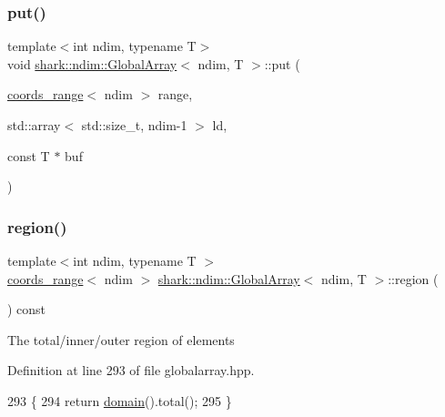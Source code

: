 \subsubsection{\texorpdfstring{put()}{put()}\hspace{0.1cm}{\footnotesize\ttfamily [3/3]}}
{\footnotesize\ttfamily template$<$int ndim, typename T$>$ \\
void \hyperlink{classshark_1_1ndim_1_1_global_array}{shark\+::ndim\+::\+Global\+Array}$<$ ndim, T $>$\+::put (\begin{DoxyParamCaption}\item[{\hyperlink{structshark_1_1ndim_1_1coords__range}{coords\+\_\+range}$<$ ndim $>$}]{range,  }\item[{std\+::array$<$ std\+::size\+\_\+t, ndim-\/1 $>$}]{ld,  }\item[{const T $\ast$}]{buf }\end{DoxyParamCaption})}

\hypertarget{classshark_1_1ndim_1_1_global_array_a40939e7384b55a49b59c63dc717224d2}{}\label{classshark_1_1ndim_1_1_global_array_a40939e7384b55a49b59c63dc717224d2} 
\subsubsection{\texorpdfstring{region()}{region()}\hspace{0.1cm}{\footnotesize\ttfamily [1/2]}}
{\footnotesize\ttfamily template$<$int ndim, typename T $>$ \\
\hyperlink{structshark_1_1ndim_1_1coords__range}{coords\+\_\+range}$<$ ndim $>$ \hyperlink{classshark_1_1ndim_1_1_global_array}{shark\+::ndim\+::\+Global\+Array}$<$ ndim, T $>$\+::region (\begin{DoxyParamCaption}{ }\end{DoxyParamCaption}) const\hspace{0.3cm}{\ttfamily [inline]}}

The total/inner/outer region of elements 

Definition at line 293 of file globalarray.\+hpp.


\begin{DoxyCode}
293                                                                     \{
294             \textcolor{keywordflow}{return} \hyperlink{classshark_1_1ndim_1_1_global_array_a435ee8ff23c3feadf2ef2be64d4f375c}{domain}().total();
295         \}
\end{DoxyCode}
\hypertarget{classshark_1_1ndim_1_1_global_array_aab2d58e37ec78fd0aca6a6366e9b7aac}{}\label{classshark_1_1ndim_1_1_global_array_aab2d58e37ec78fd0aca6a6366e9b7aac} 
